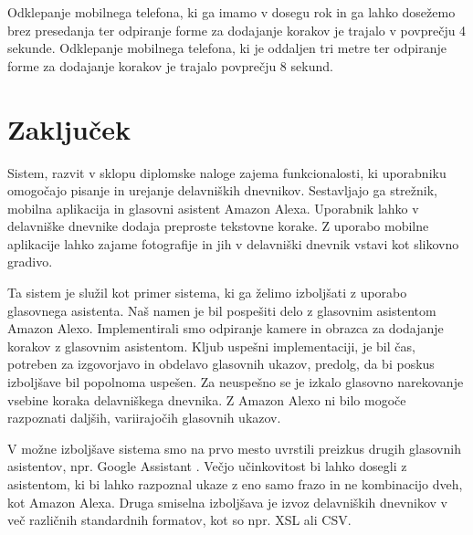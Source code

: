 \documentclass[a4paper, 12pt]{book}
\begin{document}
Odklepanje mobilnega telefona, ki ga imamo v dosegu rok in ga lahko dosežemo brez presedanja ter odpiranje forme za dodajanje korakov je trajalo v povprečju 4 sekunde.
Odklepanje mobilnega telefona, ki je oddaljen tri metre ter odpiranje forme za dodajanje korakov je trajalo povprečju 8 sekund.







\chapter{Zaključek}

Sistem, razvit v sklopu diplomske naloge zajema funkcionalosti, ki uporabniku omogočajo pisanje in urejanje delavniških dnevnikov.
Sestavljajo ga strežnik, mobilna aplikacija in glasovni asistent Amazon Alexa.
Uporabnik lahko v delavniške dnevnike dodaja preproste tekstovne korake.
Z uporabo mobilne aplikacije lahko zajame fotografije in jih v delavniški dnevnik vstavi kot slikovno gradivo.

Ta sistem je služil kot primer sistema, ki ga želimo izboljšati z uporabo glasovnega asistenta.
Naš namen je bil pospešiti delo z glasovnim asistentom Amazon Alexo.
Implementirali smo odpiranje kamere in obrazca za dodajanje korakov z glasovnim asistentom.
Kljub uspešni implementaciji, je bil čas, potreben za izgovorjavo in obdelavo glasovnih ukazov, predolg, da bi poskus izboljšave bil popolnoma uspešen.
Za neuspešno se je izkalo glasovno narekovanje vsebine koraka delavniškega dnevnika.
Z Amazon Alexo ni bilo mogoče razpoznati daljših, variirajočih glasovnih ukazov.

V možne izboljšave sistema smo na prvo mesto uvrstili preizkus drugih glasovnih asistentov, npr. Google Assistant \cite{googleass}.
Večjo učinkovitost bi lahko dosegli z asistentom, ki bi lahko razpoznal ukaze z eno samo frazo in ne kombinacijo dveh, kot Amazon Alexa.
Druga smiselna izboljšava je izvoz delavniških dnevnikov v več različnih standardnih formatov, kot so npr. XSL ali CSV.
\end{document}
